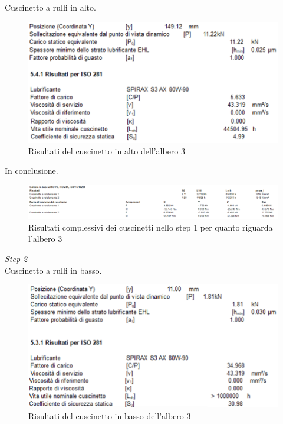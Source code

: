 Cuscinetto a rulli in alto.
\begin{figure}[h]
    \centering
    \includegraphics[scale=0.6]{Immagini/RisultatiCuscinettoAlto1Albero3.png}
    \caption{Risultati del cuscinetto in alto dell'albero 3}
    \label{fig:RisultatiCuscinettoAlto1Albero3}
\end{figure}

In conclusione.
\begin{figure}[h]
    \centering
    \includegraphics[scale=0.55]{Immagini/RisultatiCuscinetti1Albero3.png}
    \caption{Risultati complessivi dei cuscinetti nello step 1 per quanto riguarda l'albero 3}
    \label{fig:RisultatiCuscinetti1Albero3}
\end{figure}
\newpage
\emph{Step 2}\\
Cuscinetto a rulli in basso.
\begin{figure}[h]
    \centering
    \includegraphics[scale=0.6]{Immagini/RisultatiCuscinettoBasso2Albero3.png}
    \caption{Risultati del cuscinetto in basso dell'albero 3}
    \label{fig:RisultatiCuscinettoBasso2Albero3}
\end{figure}

